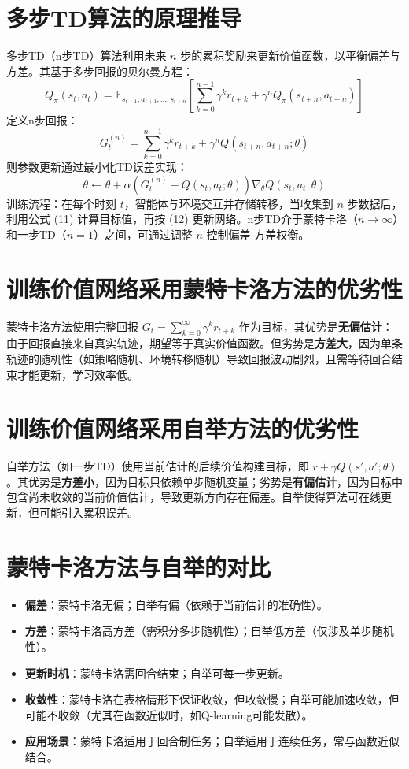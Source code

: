 \documentclass{article}
\begin{document}
\section{多步TD算法的原理推导}
多步TD（n步TD）算法利用未来 \(n\) 步的累积奖励来更新价值函数，以平衡偏差与方差。其基于多步回报的贝尔曼方程：
\[
Q_\pi(s_t,a_t) = \mathbb{E}_{s_{t+1},a_{t+1},\dots,s_{t+n}} \left[ \sum_{k=0}^{n-1} \gamma^k r_{t+k} + \gamma^n Q_\pi(s_{t+n},a_{t+n}) \right] \tag{10}
\]
定义n步回报：
\[
G_t^{(n)} = \sum_{k=0}^{n-1} \gamma^k r_{t+k} + \gamma^n Q(s_{t+n},a_{t+n};\theta) \tag{11}
\]
则参数更新通过最小化TD误差实现：
\[
\theta \leftarrow \theta + \alpha \left( G_t^{(n)} - Q(s_t,a_t;\theta) \right) \nabla_\theta Q(s_t,a_t;\theta) \tag{12}
\]
训练流程：在每个时刻 \(t\)，智能体与环境交互并存储转移，当收集到 \(n\) 步数据后，利用公式 (11) 计算目标值，再按 (12) 更新网络。n步TD介于蒙特卡洛（\(n\to\infty\)）和一步TD（\(n=1\)）之间，可通过调整 \(n\) 控制偏差-方差权衡。

\section{训练价值网络采用蒙特卡洛方法的优劣性}
蒙特卡洛方法使用完整回报 \(G_t = \sum_{k=0}^{\infty} \gamma^k r_{t+k}\) 作为目标，其优势是\textbf{无偏估计}：由于回报直接来自真实轨迹，期望等于真实价值函数。但劣势是\textbf{方差大}，因为单条轨迹的随机性（如策略随机、环境转移随机）导致回报波动剧烈，且需等待回合结束才能更新，学习效率低。

\section{训练价值网络采用自举方法的优劣性}
自举方法（如一步TD）使用当前估计的后续价值构建目标，即 \(r + \gamma Q(s',a';\theta)\)。其优势是\textbf{方差小}，因为目标只依赖单步随机变量；劣势是\textbf{有偏估计}，因为目标中包含尚未收敛的当前价值估计，导致更新方向存在偏差。自举使得算法可在线更新，但可能引入累积误差。

\section{蒙特卡洛方法与自举的对比}
\begin{itemize}
    \item \textbf{偏差}：蒙特卡洛无偏；自举有偏（依赖于当前估计的准确性）。
    \item \textbf{方差}：蒙特卡洛高方差（需积分多步随机性）；自举低方差（仅涉及单步随机性）。
    \item \textbf{更新时机}：蒙特卡洛需回合结束；自举可每一步更新。
    \item \textbf{收敛性}：蒙特卡洛在表格情形下保证收敛，但收敛慢；自举可能加速收敛，但可能不收敛（尤其在函数近似时，如Q-learning可能发散）。
    \item \textbf{应用场景}：蒙特卡洛适用于回合制任务；自举适用于连续任务，常与函数近似结合。
\end{itemize}
\end{document}
